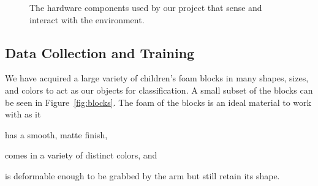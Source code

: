 \documentclass[11pt]{article}
\begin{document}
\begin{figure}
\centering
{}
\caption{The hardware components used by our project that sense and interact with the environment.}
\label{fig:hardware}
\end{figure}

\subsection{Data Collection and Training}
We have acquired a large variety of children's foam blocks in many shapes, sizes,
and colors to act as our objects for classification. A small subset of the
blocks can be seen in Figure~\ref{fig:blocks}. The foam of the blocks is an
ideal material to work with as it
\begin{inparaenum}[(1)]
\item has a smooth, matte finish,
\item comes in a variety of distinct colors, and
\item is deformable enough to be grabbed by the arm but still retain its
shape.
\end{inparaenum}
\end{document}
